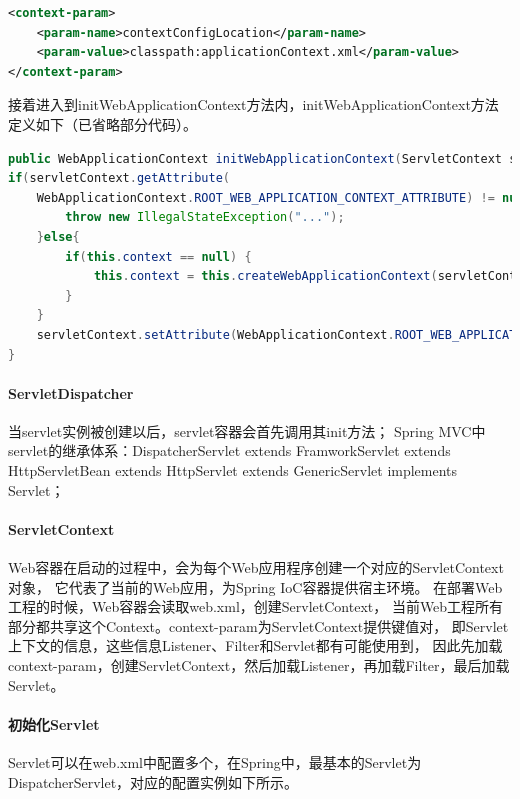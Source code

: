 \documentclass{book}
\begin{document}
\begin{lstlisting}[language=XML]
<context-param>
	<param-name>contextConfigLocation</param-name>
	<param-value>classpath:applicationContext.xml</param-value>
</context-param>
\end{lstlisting}

接着进入到initWebApplicationContext方法内，initWebApplicationContext方法定义如下（已省略部分代码）。

\begin{lstlisting}[language=Java]
public WebApplicationContext initWebApplicationContext(ServletContext servletContext) {      
if(servletContext.getAttribute(
	WebApplicationContext.ROOT_WEB_APPLICATION_CONTEXT_ATTRIBUTE) != null) {
		throw new IllegalStateException("...");
	}else{
		if(this.context == null) {
			this.context = this.createWebApplicationContext(servletContext);
		}
	}
	servletContext.setAttribute(WebApplicationContext.ROOT_WEB_APPLICATION_CONTEXT_ATTRIBUTE, this.context);
}
\end{lstlisting}

\paragraph{ServletDispatcher}

当servlet实例被创建以后，servlet容器会首先调用其init方法；
Spring MVC中servlet的继承体系：DispatcherServlet extends FramworkServlet 
extends HttpServletBean extends HttpServlet extends GenericServlet implements Servlet；

\paragraph{ServletContext}
Web容器在启动的过程中，会为每个Web应用程序创建一个对应的ServletContext对象，
它代表了当前的Web应用，为Spring IoC容器提供宿主环境。
在部署Web工程的时候，Web容器会读取web.xml，创建ServletContext，
当前Web工程所有部分都共享这个Context。context-param为ServletContext提供键值对，
即Servlet上下文的信息，这些信息Listener、Filter和Servlet都有可能使用到，
因此先加载context-param，创建ServletContext，然后加载Listener，再加载Filter，最后加载Servlet。

\paragraph{初始化Servlet}

Servlet可以在web.xml中配置多个，在Spring中，最基本的Servlet为DispatcherServlet，对应的配置实例如下所示。
\end{document}
